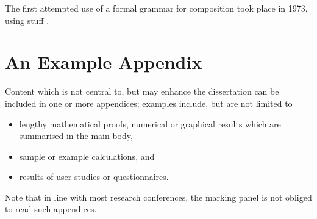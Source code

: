 \documentclass[ author={Stephen Livermore-Tozer},
				supervisor={Dr. Peter Flach},
				degree={MEng},
				title={Performing Algorithmic Co-composition Using Machine Learning},
				subtitle={},
				type={research},
				year={2016} ]{dissertation}
\begin{document}
	The first attempted use of a formal grammar for composition took place in 1973, using stuff  \cite{lidov1973melody}. %
	
	
	
	\backmatter
	
	
	
	
	
	\appendix
	
	\chapter{An Example Appendix}
	\label{appx:example}
	
	Content which is not central to, but may enhance the dissertation can be 
	included in one or more appendices; examples include, but are not limited
	to
	
	\begin{itemize}
		\item lengthy mathematical proofs, numerical or graphical results which 
		are summarised in the main body,
		\item sample or example calculations, 
		and
		\item results of user studies or questionnaires.
	\end{itemize}
	
	\noindent
	Note that in line with most research conferences, the marking panel is not
	obliged to read such appendices.
	
	
\end{document}

